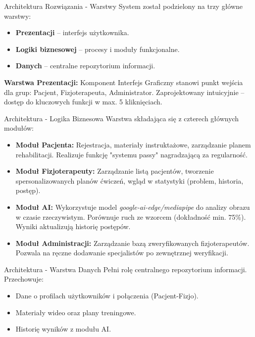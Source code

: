 \documentclass{beamer}
\begin{document}
\begin{frame}{Architektura Rozwiązania - Warstwy}
    System został podzielony na trzy główne warstwy:
    \begin{itemize}
        \item \textbf{Prezentacji} – interfejs użytkownika.
        \item \textbf{Logiki biznesowej} – procesy i moduły funkcjonalne.
        \item \textbf{Danych} – centralne repozytorium informacji.
    \end{itemize}
    \vspace{0.4cm}
    \textbf{Warstwa Prezentacji:}
    Komponent Interfejs Graficzny stanowi punkt wejścia dla grup: Pacjent, Fizjoterapeuta, Administrator. Zaprojektowany intuicyjnie – dostęp do kluczowych funkcji w max. 5 kliknięciach.
\end{frame}

\begin{frame}{Architektura - Logika Biznesowa}
    Warstwa składająca się z czterech głównych modułów:
    \begin{itemize}
        \item \textbf{Moduł Pacjenta:} Rejestracja, materiały instruktażowe, zarządzanie planem rehabilitacji. Realizuje funkcję "systemu passy" nagradzającą za regularność.
        \item \textbf{Moduł Fizjoterapeuty:} Zarządzanie listą pacjentów, tworzenie spersonalizowanych planów ćwiczeń, wgląd w statystyki (problem, historia, postęp).
        \item \textbf{Moduł AI:} Wykorzystuje model \textit{google-ai-edge/mediapipe} do analizy obrazu w czasie rzeczywistym. Porównuje ruch ze wzorcem (dokładność min. 75\%). Wyniki aktualizują historię postępów.
        \item \textbf{Moduł Administracji:} Zarządzanie bazą zweryfikowanych fizjoterapeutów. Pozwala na ręczne dodawanie specjalistów po zewnętrznej weryfikacji.
    \end{itemize}
\end{frame}

\begin{frame}{Architektura - Warstwa Danych}
    Pełni rolę centralnego repozytorium informacji. Przechowuje:
    \begin{itemize}
        \item Dane o profilach użytkowników i połączenia (Pacjent-Fizjo).
        \item Materiały wideo oraz plany treningowe.
        \item Historię wyników z modułu AI.
    \end{itemize}
\end{frame}
\end{document}
